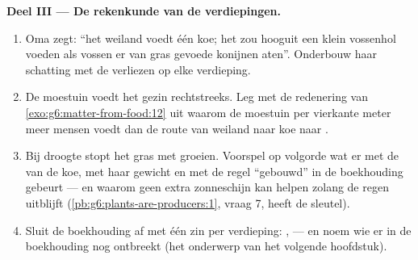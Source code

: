 \begin{problem}
\medskip\noindent\textbf{Deel III --- De rekenkunde van de
verdiepingen.}
\begin{enumerate}[resume]
  \item Oma zegt: ``het weiland voedt één koe; het zou hooguit een klein
        vossenhol voeden als vossen er van gras gevoede konijnen aten''.
        Onderbouw haar schatting met de verliezen op elke verdieping.
  \item De moestuin voedt het gezin rechtstreeks. Leg met de redenering
        van \cref{exo:g6:matter-from-food:12} uit waarom de moestuin per
        vierkante meter meer mensen voedt dan de route van weiland naar
        koe naar .
  \item Bij droogte stopt het gras met groeien. Voorspel op volgorde wat
        er met de  van de koe, met haar gewicht en met de regel
        ``gebouwd'' in de boekhouding gebeurt --- en waarom geen extra
        zonneschijn kan helpen zolang de regen uitblijft
        (\cref{pb:g6:plants-are-producers:1}, vraag 7, heeft de sleutel).
  \item Sluit de boekhouding af met één zin per verdieping: ,
         --- en noem wie er in de boekhouding nog ontbreekt
        (het onderwerp van het volgende hoofdstuk).
\end{enumerate}
\end{problem}
